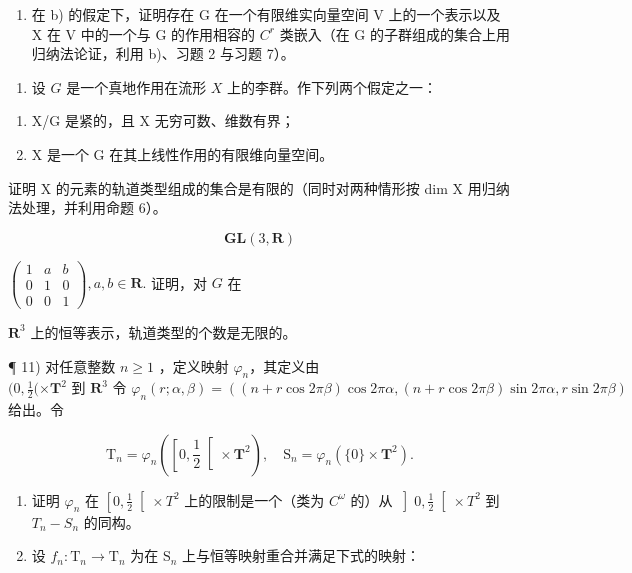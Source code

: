 \begin{enumerate}
\begin{enumerate}
\def\labelenumi{\alph{enumi})}
\setcounter{enumi}{2}
\tightlist
\item
  在 b) 的假定下，证明存在 G 在一个有限维实向量空间 V 上的一个表示以及 X 在 V 中的一个与 G 的作用相容的 \(C^{r}\) 类嵌入（在 G 的子群组成的集合上用归纳法论证，利用 b)、习题 2 与习题 7）。
\end{enumerate}

\begin{enumerate}
\def\labelenumi{\arabic{enumi})}
\setcounter{enumi}{8}
\tightlist
\item
  设 \(G\) 是一个真地作用在流形 \(X\) 上的李群。作下列两个假定之一：
\end{enumerate}

\begin{enumerate}
\def\labelenumi{(\roman{enumi})}
\tightlist
\item
  X/G 是紧的，且 X 无穷可数、维数有界；\\
\item
  X 是一个 G 在其上线性作用的有限维向量空间。
\end{enumerate}

证明 X 的元素的轨道类型组成的集合是有限的（同时对两种情形按 dim X 用归纳法处理，并利用命题 6）。

\[
\mathbf {G L} (3, \mathbf {R})
\]

\(\left(\begin{array}{ccc}1 & a & b \\ 0 & 1 & 0 \\ 0 & 0 & 1\end{array}\right), a, b \in \mathbf{R}.\) 证明，对 \(G\) 在

\(\mathbf{R}^3\) 上的恒等表示，轨道类型的个数是无限的。

\end{enumerate}
\relax{}
¶ 11) 对任意整数 \(n \geq 1\) ，定义映射 \(\varphi_n\)，其定义由 \((0, \frac{1}{2} (\times \mathbf{T}^2 \text{ 到 } \mathbf{R}^3 \text{ 令 } \varphi_n(r; \alpha, \beta) = ((n + r \cos 2\pi\beta) \cos 2\pi\alpha, (n + r \cos 2\pi\beta) \sin 2\pi\alpha, r \sin 2\pi\beta)\) 给出。令

\[
\mathrm{T} _ {n} = \varphi_ {n} \left(\left[ 0, \frac {1}{2} \right[ \times \mathbf {T} ^ {2}\right), \quad \mathrm{S} _ {n} = \varphi_ {n} (\{0 \} \times \mathbf {T} ^ {2}).
\]

\begin{enumerate}
\def\labelenumi{\alph{enumi})}
\item
  证明 \(\varphi_{n}\) 在 \(\left[0,\frac{1}{2}\right[\times T^{2}\) 上的限制是一个（类为 \(C^{\omega}\) 的）从 \(\left]0,\frac{1}{2}\right[\times T^{2}\) 到 \(T_{n}-S_{n}\) 的同构。
\item
  设 \(f_{n}:\mathrm{T}_{n}\to \mathrm{T}_{n}\) 为在 \(\mathrm{S}_n\) 上与恒等映射重合并满足下式的映射：
\end{enumerate}

